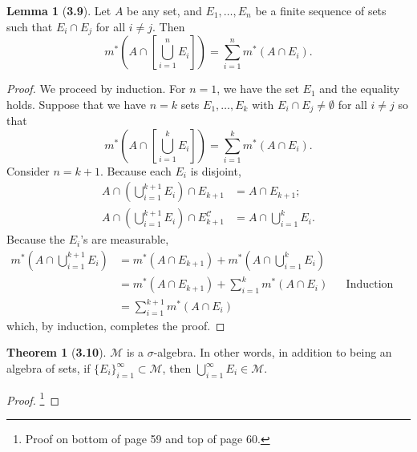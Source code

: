 \documentclass[12pt]{article}
\newcommand{\C}{\mathscr{C}}
\theoremstyle{definition}
\newtheorem*{thm}{Theorem}
\newtheorem*{lemma}{Lemma}
\begin{document}
\begin{lemma}[\textbf{3.9}]
    Let \( A \) be any set, and \( E_1, \ldots, E_n \) be a finite sequence of sets such that \( E_i \cap E_j \) for all \( i \neq j \). Then
        \[
            m^{*} \left( A \cap \left[ \bigcup_{i=1}^{n} E_i \right]\right)  = \sum_{i=1}^{n} m^{*}(A \cap E_i).
        \]

        \begin{proof}
            We proceed by induction. For \( n = 1 \), we have the set \( E_1 \) and the equality holds. Suppose that we have \( n = k \) sets \( E_1, \ldots, E_k \) with \( E_i \cap E_j \neq \emptyset \) for all \( i \neq j \) so that
                \[
                    m^{*} \left( A \cap \left[ \bigcup_{i=1}^{k} E_i \right]\right)  = \sum_{i=1}^{k} m^{*}(A \cap E_i).
                \]
            Consider \( n =  k + 1 \). Because each \( E_i \) is disjoint, 
                \begin{align*}
                    A \cap \left( \bigcup_{i=1}^{k+1} E_i \right) \cap E_{k+1}  &= A \cap E_{k+1}; \\
                    A \cap \left( \bigcup_{i=1}^{k+1} E_i \right) \cap E^{\C}_{k+1} &= A \cap \bigcup_{i=1}^{k} E_i.  
                \end{align*}
            Because the \( E_i \)'s are measurable,
                \begin{align*}
                    m^{*} \left( A \cap \bigcup_{i=1}^{k+1} E_i \right) &= m^{*} \left( A \cap E_{k+1} \right) + m^{*} \left(A \cap \bigcup_{i=1}^{k} E_i \right) \\
                    &= m^{*} \left( A \cap E_{k+1} \right) + \sum_{i=1}^{k} m^{*}(A \cap E_i) && \text{Induction Hypothesis} \\
                    &= \sum_{i=1}^{k+1} m^{*}(A \cap E_i)
                \end{align*}
            which, by induction, completes the proof. 
        \end{proof}
\end{lemma}

\begin{thm}[\textbf{3.10}]
    
    \( \mathcal{M} \) is a \( \sigma \)-algebra. In other words, in addition to being an algebra of sets, if \( \{ E_{i} \}_{i=1}^{\infty} \subset \mathcal{M}\), then 
    \( \displaystyle \bigcup_{i=1}^{\infty} E_i \in \mathcal{M} \).

        \begin{proof}\footnote{Proof on bottom of page 59 and top of page 60.}


        \end{proof}
    
\end{thm}
\end{document}
